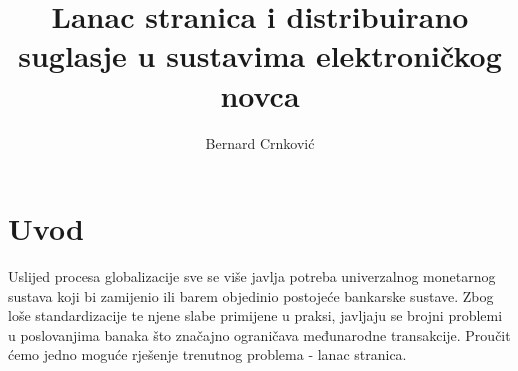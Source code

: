 \documentclass[utf8, zavrsni]{fer}
\begin{document}

\title{Lanac stranica i distribuirano suglasje u sustavima elektroničkog novca}

\author{Bernard Crnković}

\maketitle

\izvornik

\zahvala{}

\tableofcontents

\chapter{Uvod}

Uslijed procesa globalizacije sve se više javlja potreba univerzalnog monetarnog sustava koji bi zamijenio ili barem objedinio postojeće bankarske sustave. Zbog loše standardizacije te njene slabe primijene u praksi, javljaju se brojni problemi u poslovanjima banaka što značajno ograničava međunarodne transakcije. Proučit ćemo jedno moguće rješenje trenutnog problema - lanac stranica.
\end{document}
